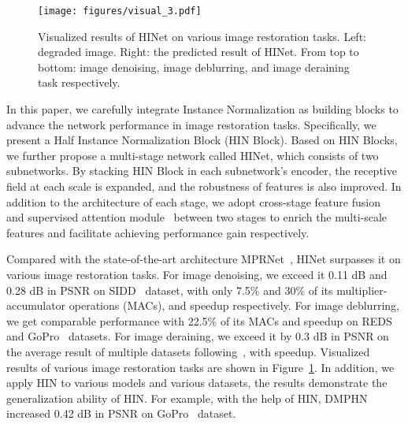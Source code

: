 \documentclass[final]{cvpr}
\begin{document}
\begin{figure}[t]
    \centering
    \texttt{[image: figures/visual\_3.pdf]}
    \vspace{-0.2cm}
    \caption{Visualized results of HINet on various image restoration tasks. Left: degraded image. Right: the predicted result of HINet. From top to bottom: image denoising, image deblurring, and image deraining task respectively.}
    \label{fig:visual_3}
    \vspace{-0.2cm}
\end{figure}

In this paper, we carefully integrate Instance Normalization as building blocks to advance the network performance in image restoration tasks. Specifically, we present a Half Instance Normalization Block (HIN Block). Based on HIN Blocks, we further propose a multi-stage network called HINet, which consists of two subnetworks. By stacking HIN Block in each subnetwork's encoder, the receptive field at each scale is expanded, and the robustness of features is also improved. In addition to the architecture of each stage, we adopt cross-stage feature fusion~\cite{zamir2021multi} and supervised attention module~\cite{zamir2021multi} between two stages to enrich the multi-scale features and facilitate achieving performance gain respectively. 




Compared with the state-of-the-art architecture MPRNet~\cite{zamir2021multi}, HINet surpasses it on various image restoration tasks. For image denoising, we exceed it 0.11 dB and 0.28 dB in PSNR on SIDD~\cite{abdelhamed2018high} dataset, with only 7.5\% and 30\% of its multiplier-accumulator operations (MACs),  and  speedup respectively. For image deblurring, we get comparable performance with 22.5\% of its MACs and  speedup on REDS~\cite{nah2019ntire} and GoPro~\cite{nah2017deep} datasets. For image deraining, we exceed it by 0.3 dB in PSNR on the average result of multiple datasets following~\cite{Zamir2021MPRNet}, with  speedup. Visualized results of various image restoration tasks are shown in Figure~\ref{fig:visual_3}. In addition, we apply HIN to various models and various datasets, the results demonstrate the generalization ability of HIN. For example, with the help of HIN, DMPHN~\cite{Zhang_2019_CVPR} increased 0.42 dB in PSNR on GoPro~\cite{nah2017deep} dataset. 
\end{document}
